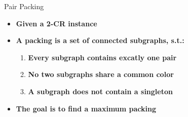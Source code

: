\begin{frame}{Pair Packing}
\begin{itemize}
\item \textbf<1> 
{Given a 2-CR instance}

\item \textbf<2>
{A packing is a set of connected subgraphs, s.t.:}
	
	\begin{enumerate}
	
	\item \textbf<3> 
	{Every subgraph contains excatly one pair}
	
	\item \textbf<4>
	{No two subgraphs share a common color} 

	\item \textbf<5>
	{A subgraph does not contain a singleton} 
	
	\end{enumerate} 

\item \textbf<6>
{The goal is to find a maximum packing}

\end{itemize}

\end{frame}